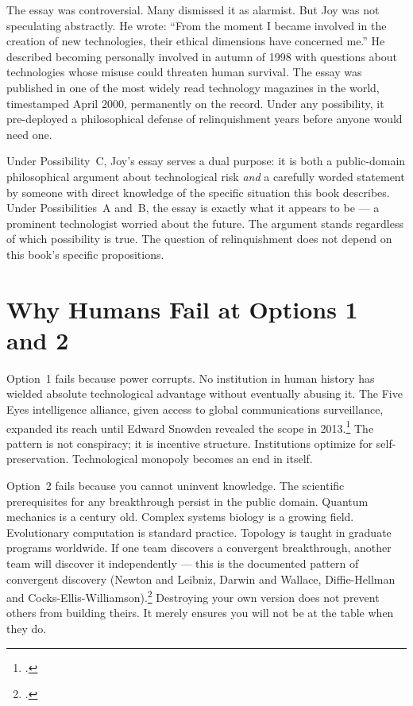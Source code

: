 The essay was controversial. Many dismissed it as alarmist. But Joy was not speculating abstractly. He wrote: ``From the moment I became involved in the creation of new technologies, their ethical dimensions have concerned me.'' He described becoming personally involved in autumn of 1998 with questions about technologies whose misuse could threaten human survival. The essay was published in one of the most widely read technology magazines in the world, timestamped April 2000, permanently on the record. Under any possibility, it pre-deployed a philosophical defense of relinquishment years before anyone would need one.

Under Possibility~C, Joy's essay serves a dual purpose: it is both a public-domain philosophical argument about technological risk \textit{and} a carefully worded statement by someone with direct knowledge of the specific situation this book describes. Under Possibilities~A and~B, the essay is exactly what it appears to be --- a prominent technologist worried about the future. The argument stands regardless of which possibility is true. The question of relinquishment does not depend on this book's specific propositions.

\section*{Why Humans Fail at Options 1 and 2}
\label{pos22:why-humans-fail-at-options-1-and-2}

Option~1 fails because power corrupts. No institution in human history has wielded absolute technological advantage without eventually abusing it. The Five Eyes intelligence alliance, given access to global communications surveillance, expanded its reach until Edward Snowden revealed the scope in 2013.\footcite{greenwald2014} The pattern is not conspiracy; it is incentive structure. Institutions optimize for self-preservation. Technological monopoly becomes an end in itself. 

Option~2 fails because you cannot uninvent knowledge. The scientific prerequisites for any breakthrough persist in the public domain.  Quantum mechanics is a century old. Complex systems biology is a growing field. Evolutionary computation is standard practice. Topology is taught in graduate programs worldwide. If one team discovers a convergent breakthrough, another team will discover it independently --- this is the documented pattern of convergent discovery (Newton and Leibniz, Darwin and Wallace, Diffie-Hellman and Cocks-Ellis-Williamson).\footcite{merton1961} Destroying your own version does not prevent others from building theirs. It merely ensures you will not be at the table when they do.

